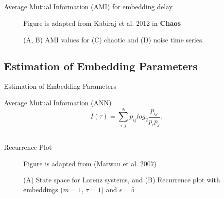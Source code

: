 \subsection{}
{

\begin{frame}{Average Mutual Information (AMI) for embedding delay}
    \begin{figure}
        \centering
	{Figure is adapted from Kabiraj et al. 2012 in {\bf Chaos}}
	\caption{(A, B) AMI values for (C) chaotic and (D) noise time series.} 
   \end{figure}
	
\end{frame}
}





\subsection{Estimation of Embedding Parameters}
{

\begin{frame}{Estimation of Embedding Parameters }

\begin{block}{Average Mutual Information (ANN)}
\begin{equation*}
I(\tau) = \sum_{i,j}^N p_{ij} log_2 \frac{ p_{ij} }{ p_i p_j }.
\end{equation*}
\end{block}

\end{frame}
}





\subsection{}
{

\begin{frame}{Recurrence Plot}
    \begin{figure}
		{Figure is adapted from (Marwan et al. 2007)}
	\caption{(A) State space for Lorenz systems, and 
		(B) Recurrence plot with embeddings ($m=1$, $\tau=1$) and $\epsilon=5$} 
   \end{figure}

\end{frame}
}



